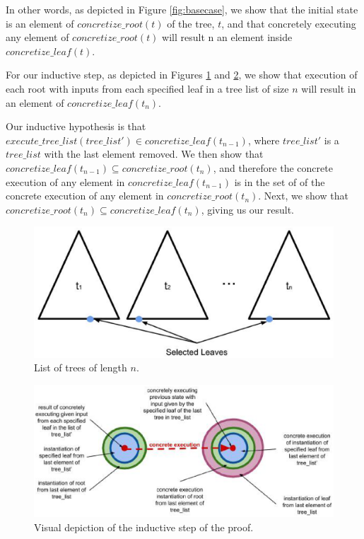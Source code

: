 In other words, as depicted in Figure \ref{fig:basecase}, we show that the initial state is an element of $concretize\_root(t)$ of the tree, $t$, and that concretely executing any element of $concretize\_root(t)$ will result n an element inside $concretize\_leaf(t).$



For our inductive step, as depicted in Figures  \ref{fig:tlist} and \ref{fig:indstep}, we show that execution of each root with inputs from each specified leaf in a tree list of size $n$ will result in an element of $concretize\_leaf(t_n)$.

Our inductive hypothesis is that $execute\_tree\_list (tree\_list') \in concretize\_leaf (t_{n-1})$, where $tree\_list'$ is a $tree\_list$ with the last element removed. We then show that $concretize\_leaf (t_{n-1}) \subseteq concretize\_root (t_{n}) $, and therefore the concrete execution of any element in $concretize\_leaf (t_{n-1}) $ is in the set of of the concrete execution of any element in $concretize\_root (t_{n})$. Next, we show that $concretize\_root (t_{n}) \subseteq concretize\_leaf (t_{n})$, giving us our result.
 
\begin{figure}
\includegraphics[width=\textwidth]{tlist.eps}
\caption{List of trees of length $n$.}
\label{fig:tlist}
\end{figure}

\begin{figure}
\includegraphics[width=\textwidth]{set4.eps}
\caption{Visual depiction of the inductive step of the proof.}
\label{fig:indstep}
\end{figure}
